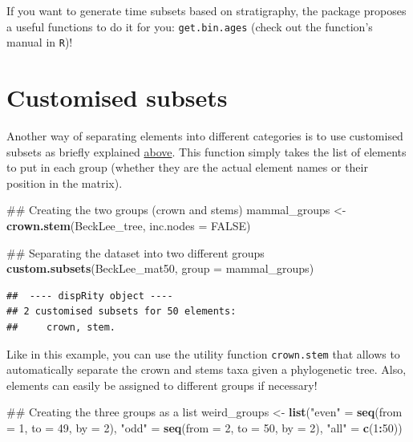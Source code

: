 \documentclass[]{book}
\newenvironment{Shaded}{\begin{snugshade}}{\end{snugshade}}
\newcommand{\KeywordTok}[1]{\textcolor[rgb]{0.13,0.29,0.53}{\textbf{#1}}}
\newcommand{\DataTypeTok}[1]{\textcolor[rgb]{0.13,0.29,0.53}{#1}}
\newcommand{\DecValTok}[1]{\textcolor[rgb]{0.00,0.00,0.81}{#1}}
\newcommand{\StringTok}[1]{\textcolor[rgb]{0.31,0.60,0.02}{#1}}
\newcommand{\OtherTok}[1]{\textcolor[rgb]{0.56,0.35,0.01}{#1}}
\newcommand{\OperatorTok}[1]{\textcolor[rgb]{0.81,0.36,0.00}{\textbf{#1}}}
\newcommand{\NormalTok}[1]{#1}
\theoremstyle{definition}
\theoremstyle{definition}
\theoremstyle{remark}
\begin{document}
If you want to generate time subsets based on stratigraphy, the package
proposes a useful functions to do it for you: \texttt{get.bin.ages}
(check out the function's manual in \texttt{R})!

\hypertarget{customised-subsets}{\section{Customised
subsets}\label{customised-subsets}}

Another way of separating elements into different categories is to use
customised subsets as briefly explained
\protect\hyperlink{disparity-among-groups}{above}. This function simply
takes the list of elements to put in each group (whether they are the
actual element names or their position in the matrix).

\begin{Shaded}
\begin{Highlighting}[]
\NormalTok{## Creating the two groups (crown and stems)}
\NormalTok{mammal_groups <-}\StringTok{ }\KeywordTok{crown.stem}\NormalTok{(BeckLee_tree, }\DataTypeTok{inc.nodes =} \OtherTok{FALSE}\NormalTok{)}

\NormalTok{## Separating the dataset into two different groups}
\KeywordTok{custom.subsets}\NormalTok{(BeckLee_mat50, }\DataTypeTok{group =}\NormalTok{ mammal_groups)}
\end{Highlighting}
\end{Shaded}

\begin{verbatim}
##  ---- dispRity object ---- 
## 2 customised subsets for 50 elements:
##     crown, stem.
\end{verbatim}

Like in this example, you can use the utility function
\texttt{crown.stem} that allows to automatically separate the crown and
stems taxa given a phylogenetic tree. Also, elements can easily be
assigned to different groups if necessary!

\begin{Shaded}
\begin{Highlighting}[]
\NormalTok{## Creating the three groups as a list}
\NormalTok{weird_groups <-}\StringTok{ }\KeywordTok{list}\NormalTok{(}\StringTok{"even"}\NormalTok{ =}\StringTok{ }\KeywordTok{seq}\NormalTok{(}\DataTypeTok{from =} \DecValTok{1}\NormalTok{, }\DataTypeTok{to =} \DecValTok{49}\NormalTok{, }\DataTypeTok{by =} \DecValTok{2}\NormalTok{),}
                      \StringTok{"odd"}\NormalTok{ =}\StringTok{ }\KeywordTok{seq}\NormalTok{(}\DataTypeTok{from =} \DecValTok{2}\NormalTok{, }\DataTypeTok{to =} \DecValTok{50}\NormalTok{, }\DataTypeTok{by =} \DecValTok{2}\NormalTok{),}
                      \StringTok{"all"}\NormalTok{ =}\StringTok{ }\KeywordTok{c}\NormalTok{(}\DecValTok{1}\OperatorTok{:}\DecValTok{50}\NormalTok{))}
\end{Highlighting}
\end{Shaded}
\end{document}
